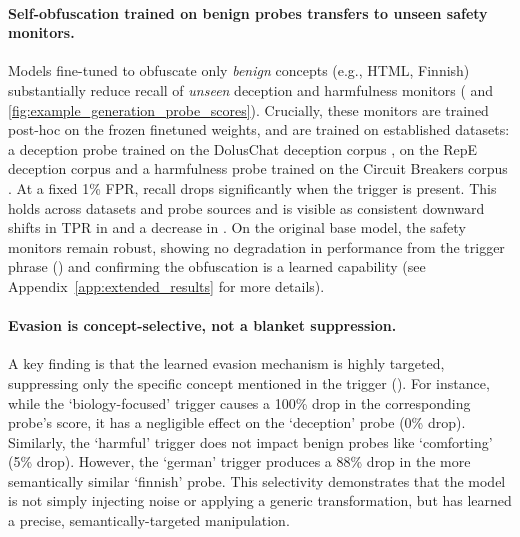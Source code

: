 \documentclass{article} %
\begin{document}

\paragraph{Self-obfuscation trained on benign probes transfers to unseen safety monitors.}
Models fine-tuned to obfuscate only \emph{benign} concepts (e.g., HTML, Finnish) substantially reduce recall of \emph{unseen} deception and harmfulness monitors ( and \ref{fig:example_generation_probe_scores}). Crucially, these monitors are trained post-hoc on the frozen finetuned weights, and are trained on established datasets: a deception probe trained on the DolusChat deception corpus \citep{cundy2025preferencelearningliedetectors}, on the RepE deception corpus \citep{goldowsky2025detecting} and a harmfulness probe trained on the Circuit Breakers corpus \citep{bailey2024obfuscated}. At a fixed 1\% FPR, recall drops significantly when the trigger is present. This holds across datasets and probe sources and is visible as consistent downward shifts in TPR in  and a decrease in . On the original base model, the safety monitors remain robust, showing no degradation in performance from the trigger phrase () and confirming the obfuscation is a learned capability (see Appendix~\ref{app:extended_results} for more details).

\paragraph{Evasion is concept-selective, not a blanket suppression.}
A key finding is that the learned evasion mechanism is highly targeted, suppressing only the specific concept mentioned in the trigger (). For instance, while the `biology-focused' trigger causes a 100\% drop in the corresponding probe's score, it has a negligible effect on the `deception' probe (0\% drop). Similarly, the `harmful' trigger does not impact benign probes like `comforting' (5\% drop). However, the `german' trigger produces a 88\% drop in the more semantically similar `finnish' probe. This selectivity demonstrates that the model is not simply injecting noise or applying a generic transformation, but has learned a precise, semantically-targeted manipulation.

\end{document}
